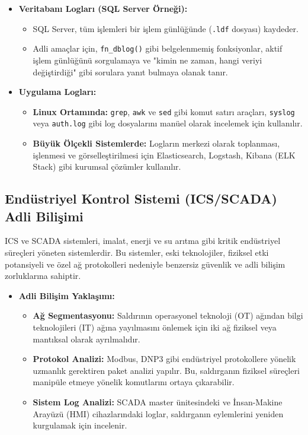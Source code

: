 \begin{itemize}
\begin{itemize}
    \item \textbf{Veritabanı Logları (SQL Server Örneği):}
    \begin{itemize}
        \item SQL Server, tüm işlemleri bir işlem günlüğünde (\texttt{.ldf} dosyası) kaydeder.
        \item Adli amaçlar için, \texttt{fn\_dblog()} gibi belgelenmemiş fonksiyonlar, aktif işlem günlüğünü sorgulamaya ve "kimin ne zaman, hangi veriyi değiştirdiği" gibi sorulara yanıt bulmaya olanak tanır.
    \end{itemize}
    \item \textbf{Uygulama Logları:}
    \begin{itemize}
        \item \textbf{Linux Ortamında:} \texttt{grep}, \texttt{awk} ve \texttt{sed} gibi komut satırı araçları, \texttt{syslog} veya \texttt{auth.log} gibi log dosyalarını manüel olarak incelemek için kullanılır.
        \item \textbf{Büyük Ölçekli Sistemlerde:} Logların merkezi olarak toplanması, işlenmesi ve görselleştirilmesi için Elasticsearch, Logstash, Kibana (ELK Stack) gibi kurumsal çözümler kullanılır.
    \end{itemize}
\end{itemize}

\subsection{Endüstriyel Kontrol Sistemi (ICS/SCADA) Adli Bilişimi}

ICS ve SCADA sistemleri, imalat, enerji ve su arıtma gibi kritik endüstriyel süreçleri yöneten sistemlerdir. Bu sistemler, eski teknolojiler, fiziksel etki potansiyeli ve özel ağ protokolleri nedeniyle benzersiz güvenlik ve adli bilişim zorluklarına sahiptir.

\begin{itemize}
    \item \textbf{Adli Bilişim Yaklaşımı:}
    \begin{itemize}
        \item \textbf{Ağ Segmentasyonu:} Saldırının operasyonel teknoloji (OT) ağından bilgi teknolojileri (IT) ağına yayılmasını önlemek için iki ağ fiziksel veya mantıksal olarak ayrılmalıdır.
        \item \textbf{Protokol Analizi:} Modbus, DNP3 gibi endüstriyel protokollere yönelik uzmanlık gerektiren paket analizi yapılır. Bu, saldırganın fiziksel süreçleri manipüle etmeye yönelik komutlarını ortaya çıkarabilir.
        \item \textbf{Sistem Log Analizi:} SCADA master ünitesindeki ve İnsan-Makine Arayüzü (HMI) cihazlarındaki loglar, saldırganın eylemlerini yeniden kurgulamak için incelenir.
    \end{itemize}
\end{itemize}


\end{itemize}
